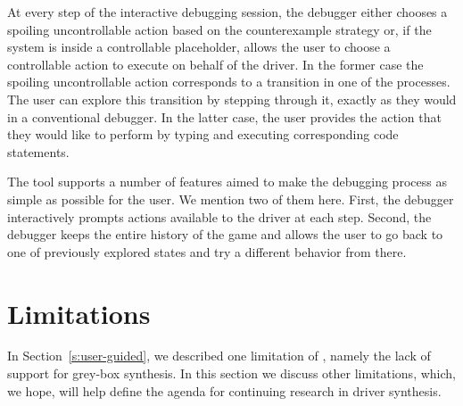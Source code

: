 At every step of the interactive debugging session, the debugger either chooses a spoiling uncontrollable action based on the counterexample strategy or, if the system is inside a controllable placeholder, allows the user to choose a controllable action to execute on behalf of the driver.  In the former case the spoiling uncontrollable action corresponds to a transition in one of the \tsl processes.  The user can explore this transition by stepping through it, exactly as they would in a conventional debugger.  In the latter case, the user provides the action that they would like to perform by typing and executing corresponding code statements.

The tool supports a number of features aimed to make the debugging process as simple as possible for the user. We mention two of them here.  First, the debugger interactively prompts actions available to the driver at each step.  Second, the debugger keeps the entire history of the game and allows the user to go back to one of previously explored states and try a different behavior from there.

\section{Limitations}\label{s:limitations}

In Section~\ref{s:user-guided}, we described one limitation of \termite, namely the lack of support for grey-box synthesis.  In this section we discuss other limitations, which, we hope, will help define the agenda for continuing research in driver synthesis.





